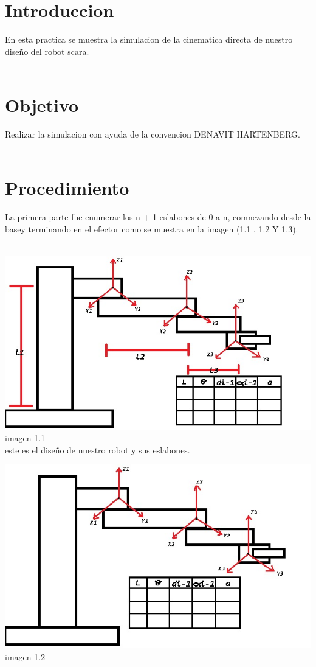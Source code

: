 \documentclass[10pt,a4paper]{article}
\begin{document}
		\section{ \Huge Introduccion}
{\Large En esta practica se muestra la simulacion de la cinematica directa de nuestro diseño del robot scara.} \\ \\
\section{{\Huge Objetivo}}
{\Large Realizar la simulacion con ayuda de la convencion DENAVIT HARTENBERG.}\\ \\
\section{{\Huge Procedimiento}}
{\Large La primera parte fue enumerar los n + 1 eslabones de 0 a n, comnezando desde la basey terminando en el efector como se muestra en la imagen (1.1 , 1.2 Y 1.3).}\\ \\
\begin{center}
\includegraphics[scale=0.5]{imagenes/A.png} imagen 1.1  
\\{este es el diseño de nuestro robot y sus eslabones.} \\ 
\end{center}
\begin{center}
\includegraphics[scale=0.5]{imagenes/B.png} imagen 1.2  
\end{center}
\end{document}
